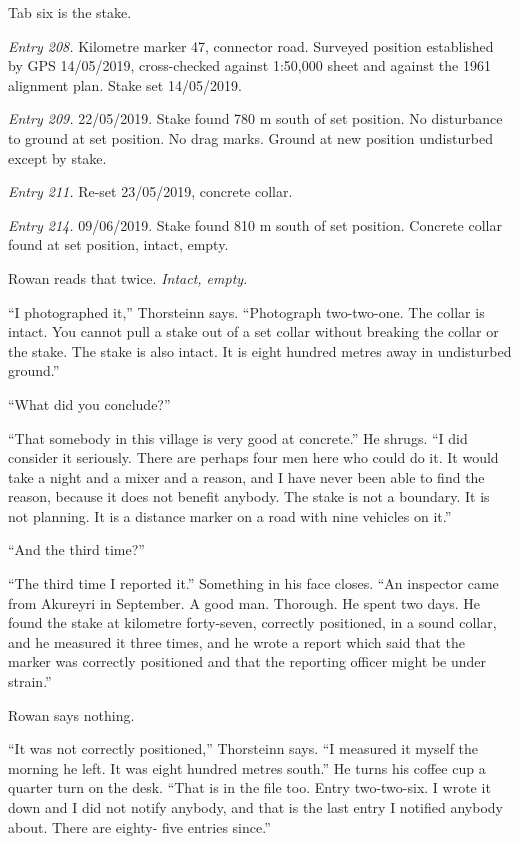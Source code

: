 \documentclass[11pt,oneside]{book}
\begin{document}
Tab six is the stake.

\emph{Entry 208.} Kilometre marker 47, connector road. Surveyed
position established by GPS 14/05/2019, cross-checked against 1:50,000
sheet and against the 1961 alignment plan. Stake set 14/05/2019.

\emph{Entry 209.} 22/05/2019. Stake found 780 m south of set position.
No disturbance to ground at set position. No drag marks. Ground at new
position undisturbed except by stake.

\emph{Entry 211.} Re-set 23/05/2019, concrete collar.

\emph{Entry 214.} 09/06/2019. Stake found 810 m south of set position.
Concrete collar found at set position, intact, empty.

Rowan reads that twice. \emph{Intact, empty.}

``I photographed it,'' Thorsteinn says. ``Photograph two-two-one. The
collar is intact. You cannot pull a stake out of a set collar without
breaking the collar or the stake. The stake is also intact. It is
eight hundred metres away in undisturbed ground.''

``What did you conclude?''

``That somebody in this village is very good at concrete.'' He shrugs.
``I did consider it seriously. There are perhaps four men here who could
do it. It would take a night and a mixer and a reason, and I have never
been able to find the reason, because it does not benefit anybody. The
stake is not a boundary. It is not planning. It is a distance marker on
a road with nine vehicles on it.''

``And the third time?''

``The third time I reported it.'' Something in his face closes. ``An
inspector came from Akureyri in September. A good man. Thorough. He
spent two days. He found the stake at kilometre forty-seven, correctly
positioned, in a sound collar, and he measured it three times, and he
wrote a report which said that the marker was correctly positioned and
that the reporting officer might be under strain.''

Rowan says nothing.

``It was not correctly positioned,'' Thorsteinn says. ``I measured it
myself the morning he left. It was eight hundred metres south.'' He
turns his coffee cup a quarter turn on the desk. ``That is in the file
too. Entry two-two-six. I wrote it down and I did not notify anybody,
and that is the last entry I notified anybody about. There are eighty-
five entries since.''
\end{document}
